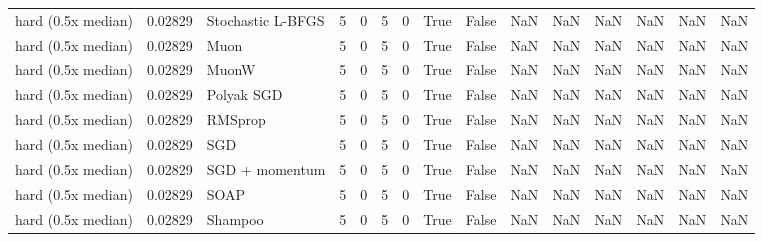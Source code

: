 \begin{tabular}{lrlrrrrrrrrrrrr}
hard (0.5x median) & 0.02829 & Stochastic L-BFGS & 5 & 0 & 5 & 0 & True & False & NaN & NaN & NaN & NaN & NaN & NaN \\
hard (0.5x median) & 0.02829 & Muon & 5 & 0 & 5 & 0 & True & False & NaN & NaN & NaN & NaN & NaN & NaN \\
hard (0.5x median) & 0.02829 & MuonW & 5 & 0 & 5 & 0 & True & False & NaN & NaN & NaN & NaN & NaN & NaN \\
hard (0.5x median) & 0.02829 & Polyak SGD & 5 & 0 & 5 & 0 & True & False & NaN & NaN & NaN & NaN & NaN & NaN \\
hard (0.5x median) & 0.02829 & RMSprop & 5 & 0 & 5 & 0 & True & False & NaN & NaN & NaN & NaN & NaN & NaN \\
hard (0.5x median) & 0.02829 & SGD & 5 & 0 & 5 & 0 & True & False & NaN & NaN & NaN & NaN & NaN & NaN \\
hard (0.5x median) & 0.02829 & SGD + momentum & 5 & 0 & 5 & 0 & True & False & NaN & NaN & NaN & NaN & NaN & NaN \\
hard (0.5x median) & 0.02829 & SOAP & 5 & 0 & 5 & 0 & True & False & NaN & NaN & NaN & NaN & NaN & NaN \\
hard (0.5x median) & 0.02829 & Shampoo & 5 & 0 & 5 & 0 & True & False & NaN & NaN & NaN & NaN & NaN & NaN \\
\bottomrule
\end{tabular}
